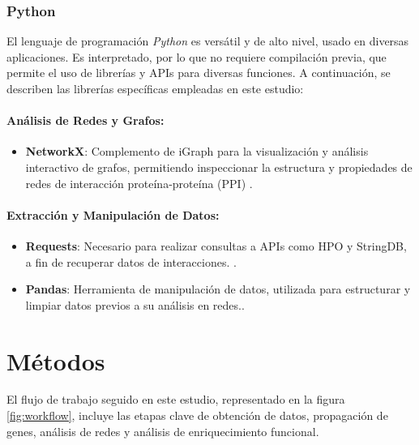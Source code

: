 \subsubsection{Python}
El lenguaje de programación \textit{Python} es versátil y de alto nivel, usado en diversas aplicaciones.  Es interpretado, por lo que no requiere compilación previa, que permite el uso de librerías y APIs para diversas funciones. A continuación, se describen las librerías específicas empleadas en este estudio:

\paragraph{Análisis de Redes y Grafos:}
\begin{itemize}
	\item \textbf{NetworkX}: Complemento de iGraph para la visualización y análisis interactivo de grafos, permitiendo inspeccionar la estructura y propiedades de redes de interacción proteína-proteína (PPI) \cite{hagberg2008}.
\end{itemize}

\paragraph{Extracción y Manipulación de Datos:}
\begin{itemize}
	\item \textbf{Requests}: Necesario para realizar consultas a APIs como HPO y StringDB, a fin de recuperar datos de interacciones. \cite{Requests2020}.
	\item \textbf{Pandas}: Herramienta de manipulación de datos, utilizada para estructurar y limpiar datos previos a su análisis en redes.\cite{McKinney2010}.
\end{itemize}

\section{Métodos}

El flujo de trabajo seguido en este estudio, representado en la figura \ref{fig:workflow}, incluye las etapas clave de obtención de datos, propagación de genes, análisis de redes y análisis de enriquecimiento funcional.

